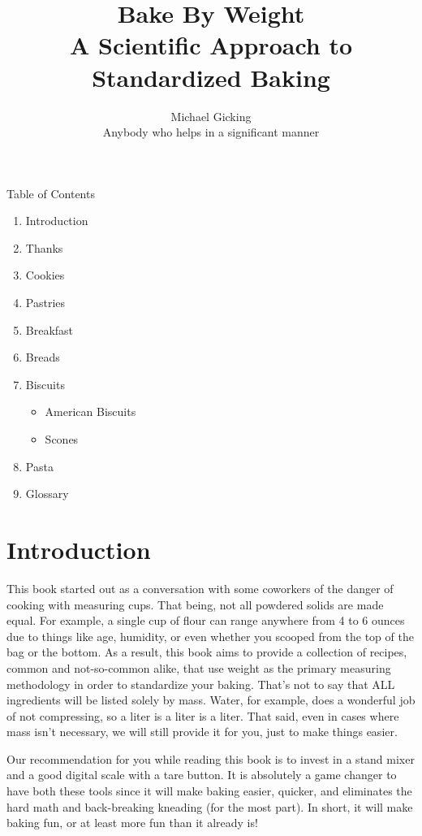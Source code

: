 \documentclass[titlepage]{article}
\title{%
Bake By Weight\\
\large A Scientific Approach to Standardized Baking}
\author{Michael Gicking\\ Anybody who helps in a significant manner}
\begin{document}
\maketitle
Table of Contents
\begin{enumerate}
	\item Introduction
	\item Thanks
	\item Cookies
	\item Pastries
	\item Breakfast
	\item Breads
	\item Biscuits
		\begin{itemize}
			\item American Biscuits
			\item Scones
		\end{itemize}
	\item Pasta
	\item Glossary
\end{enumerate}

\pagebreak
\section*{Introduction}
This book started out as a conversation with some coworkers of the danger of cooking with measuring cups. That being, not all powdered solids are made equal. For example, a single cup of flour can range anywhere from 4 to 6 ounces due to things like age, humidity, or even whether you scooped from the top of the bag or the bottom. As a result, this book aims to provide a collection of recipes, common and not-so-common alike, that use weight as the primary measuring methodology in order to standardize your baking. That's not to say that ALL ingredients will be listed solely by mass. Water, for example, does a wonderful job of not compressing, so a liter is a liter is a liter. That said, even in cases where mass isn't necessary, we will still provide it for you, just to make things easier.
\vspace{\baselineskip}

\noindent Our recommendation for you while reading this book is to invest in a stand mixer and a good digital scale with a tare button. It is absolutely a game changer to have both these tools since it will make baking easier, quicker, and eliminates the hard math and back-breaking kneading (for the most part). In short, it will make baking fun, or at least more fun than it already is!
\vspace{\baselineskip}
\end{document}
